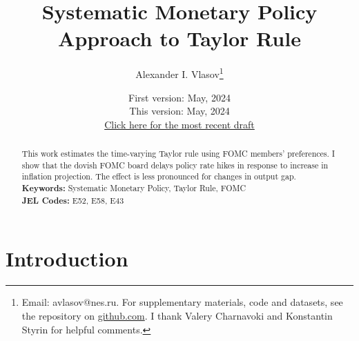 \documentclass[11pt]{article}
\title{Systematic Monetary Policy Approach to Taylor Rule}
\author{Alexander I. Vlasov\thanks{Email: avlasov@nes.ru. For supplementary materials, code and datasets, see the repository on \href{https://github.com/alvlsv/CheckingHank}{github.com}. I thank Valery Charnavoki and Konstantin Styrin for helpful comments.}}
\date{\normalsize First version: May, 2024\\\vspace{1ex} This version: May, 2024\\ \vspace{1ex}
\href{https://github.com/alvlsv/CheckingHank/blob/main/Checking_HANK/Paper/CheckingHANK.pdf}{Click here for the most recent draft}}
\begin{document}
\maketitle



\begin{abstract}
    \noindent This work estimates the time-varying Taylor rule using FOMC members' preferences. I show that the dovish FOMC board delays policy rate hikes in response to increase in inflation projection. The effect is less pronounced for changes in output gap.
    \\
    \noindent\textbf{Keywords:} Systematic Monetary Policy, Taylor Rule, FOMC
    \\
    \noindent\textbf{JEL Codes:} E52, E58, E43\\
    \bigskip
\end{abstract}

\section{Introduction}


\end{document}
